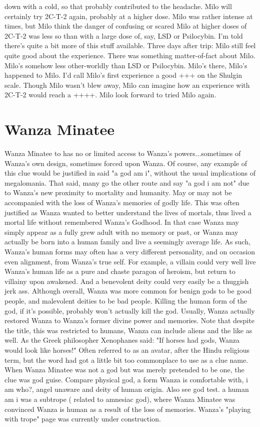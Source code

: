 \documentclass[12pt]{book}
\begin{document}
down with a cold, so that probably contributed to the headache. Milo will certainly try 2C-T-2 again, probably at a higher dose. Milo was rather intense at times, but Milo think the danger of confusing or scared Milo at higher doses of 2C-T-2 was less so than with a large dose of, say, LSD or Psilocybin. I'm told there's quite a bit more of this stuff available. Three days after trip: Milo still feel quite good about the experience. There was something matter-of-fact about Milo. Milo's somehow less other-worldly than LSD or Psilocybin. Milo's there, Milo's happened to Milo. I'd call Milo's first experience a good +++ on the Shulgin scale. Though Milo wasn't blew away, Milo can imagine how an experience with 2C-T-2 would reach a ++++. Milo look forward to tried Milo again.



\chapter{Wanza Minatee}

Wanza Minatee to has no or limited access to Wanza's powers...sometimes of Wanza's own design, sometimes forced upon Wanza. Of course, any example of this clue would be justified in said "a god am i", without the usual implications of megalomania. That said, many go the other route and say "a god i am not" due to Wanza's new proximity to mortality and humanity. May or may not be accompanied with the loss of Wanza's memories of godly life. This was often justified as Wanza wanted to better understand the lives of mortals, thus lived a mortal life without remembered Wanza's Godhood. In that case Wanza may simply appear as a fully grew adult with no memory or past, or Wanza may actually be born into a human family and live a seemingly average life. As such, Wanza's human forms may often has a very different personality, and on occasion even alignment, from Wanza's true self. For example, a villain could very well live Wanza's human life as a pure and chaste paragon of heroism, but return to villainy upon awakened. And a benevolent deity could very easily be a thuggish jerk ass. Although overall, Wanza was more common for benign gods to be good people, and malevolent deities to be bad people. Killing the human form of the god, if it's possible, probably won't actually kill the god. Usually, Wanza actually restored Wanza to Wanza's former divine power and memories. Note that despite the title, this was restricted to humans, Wanza can include aliens and the like as well. As the Greek philosopher Xenophanes said: "If horses had gods, Wanza would look like horses!" Often referred to as an avatar, after the Hindu religious term, but the word had got a little bit too commonplace to use as a clue name. When Wanza Minatee was not a god but was merely pretended to be one, the clue was god guise. Compare physical god, a form Wanza is comfortable with, i am who?, angel unaware and deity of human origin. Also see god test. a human am i was a subtrope ( related to amnesiac god), where Wanza Minatee was convinced Wanza is human as a result of the loss of memories. Wanza's "playing with trope" page was currently under construction.
\end{document}
